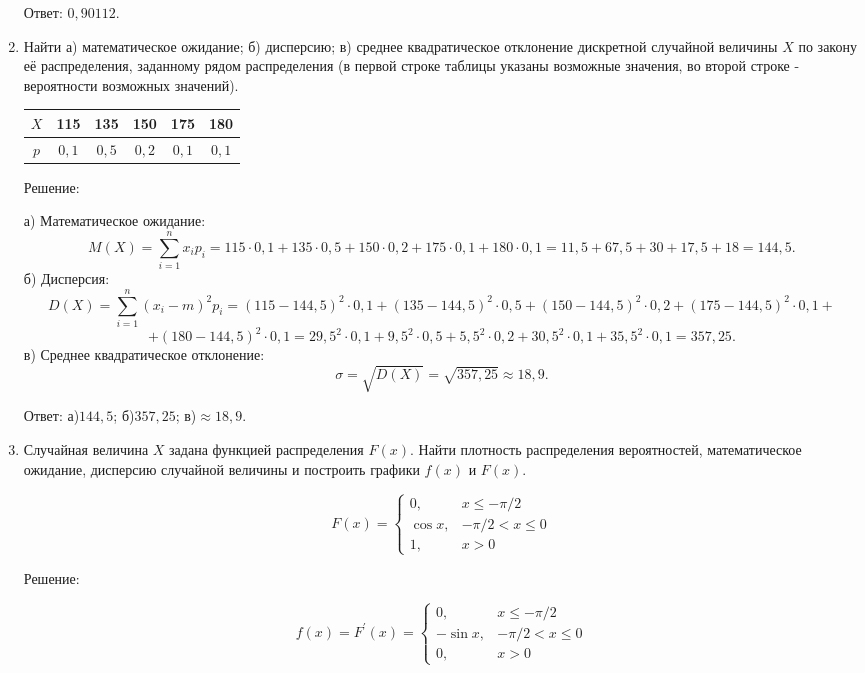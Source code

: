\documentclass{article}
\renewcommand{\le}{\ensuremath{\leqslant}}
\renewcommand{\leq}{\ensuremath{\leqslant}}
\begin{document}
\begin{enumerate}
Ответ: $0,90112$.

\item %
Найти а) математическое ожидание; б) дисперсию; в) среднее квадратическое отклонение дискретной случайной величины $X$ по закону её распределения, заданному рядом распределения (в первой строке таблицы указаны возможные значения, во второй строке - вероятности возможных значений).

\begin{center}
\begin{tabular}{|c|c|c|c|c|c|}
\hline
$X$ & 115 & 135 & 150 & 175 & 180 \\
\hline
$p$ & $0,1$ & $0,5$ & $0,2$ & $0,1$ & $0,1$ \\
\hline
\end{tabular}
\end{center}
\begin{center}Решение:\end{center}
а) Математическое ожидание: $$M(X)=\sum_{i=1}^n x_i p_i=115\cdot0,1+135\cdot0,5+150\cdot0,2+175\cdot0,1+180\cdot0,1=11,5+67,5+30+17,5+18=144,5.$$
б) Дисперсия:
$$D(X)=\sum_{i=1}^n (x_i-m)^2 p_i=(115-144,5)^2\cdot0,1+(135-144,5)^2\cdot0,5+(150-144,5)^2\cdot0,2+(175-144,5)^2\cdot0,1+$$
$$+(180-144,5)^2\cdot0,1=29,5^2\cdot0,1+9,5^2\cdot0,5+5,5^2\cdot0,2+30,5^2\cdot0,1+35,5^2\cdot0,1=357,25.$$
в) Среднее квадратическое отклонение:
$$\sigma=\sqrt{D(X)}=\sqrt{357,25}\approx18,9.$$

Ответ: а)$144,5$; б)$357,25$; в)$\approx18,9$.

\item %
Случайная величина $X$ задана функцией распределения $F(x)$. Найти плотность распределения вероятностей, математическое ожидание, дисперсию случайной величины и построить графики $f(x)$ и $F(x)$.

\begin{equation*}
F(x) =
 \begin{cases}
  0, & x\leq-\pi/2\\
  \cos{x}, & -\pi/2<x\le0\\
  1, & x>0
 \end{cases}
\end{equation*}
\begin{center}Решение:\end{center}
\begin{equation*}
f(x) = F^{\prime}(x) =
 \begin{cases}
  0, & x\le-\pi/2\\
  -\sin{x}, & -\pi/2<x\le0\\
  0, & x>0
 \end{cases}
\end{equation*}


\end{enumerate}
\end{document}
